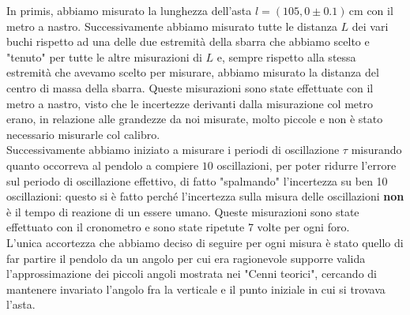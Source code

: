\documentclass{article}
\begin{document}
In primis, abbiamo misurato la lunghezza dell'asta $l = (105,0 \pm 0.1) \,  \text{cm}$ con il metro a nastro. Successivamente abbiamo misurato tutte le distanza $L$ dei vari buchi rispetto ad una delle due estremità della sbarra che abbiamo scelto e "tenuto" per tutte le altre misurazioni di $L$ e, sempre rispetto alla stessa estremità che avevamo scelto per misurare, abbiamo misurato la distanza del centro di massa della sbarra. Queste misurazioni sono state effettuate con il metro a nastro, visto che le incertezze derivanti dalla misurazione col metro erano, in relazione alle grandezze da noi misurate, molto piccole e non è stato necessario misurarle col calibro.\\
Successivamente abbiamo iniziato a misurare i periodi di oscillazione $\tau$ misurando quanto occorreva al pendolo a compiere $10$ oscillazioni, per poter ridurre l'errore sul periodo di oscillazione effettivo, di fatto "spalmando" l'incertezza su ben 10 oscillazioni: questo si è fatto perché l'incertezza sulla misura delle oscillazioni \textbf{non} è il tempo di reazione di un essere umano. Queste misurazioni sono state effettuato con il cronometro e sono state ripetute 7 volte per ogni foro. \\
L'unica accortezza che abbiamo deciso di seguire per ogni misura è stato quello di far partire il pendolo da un angolo per cui era ragionevole supporre valida l'approssimazione dei piccoli angoli mostrata nei "Cenni teorici", cercando di mantenere invariato l'angolo fra la verticale e il punto iniziale in cui si trovava l'asta.
\end{document}
